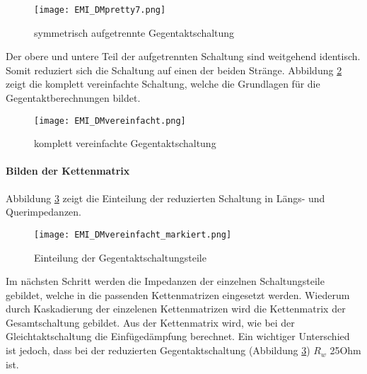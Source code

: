 \begin{figure}[H]
	\centering
	\texttt{[image: EMI\_DMpretty7.png]}
	\caption{symmetrisch aufgetrennte Gegentaktschaltung}
	\label{fig:DMSchaltungSymAufgetrennt}
\end{figure}
Der obere und untere Teil der aufgetrennten Schaltung sind weitgehend identisch. Somit reduziert sich die Schaltung auf einen der beiden Stränge. Abbildung \ref{fig:DMSchaltungvereinfacht} zeigt die komplett vereinfachte Schaltung, welche die Grundlagen für die Gegentaktberechnungen bildet. 
\begin{figure}[H]
	\centering
	\texttt{[image: EMI\_DMvereinfacht.png]}
	\caption{komplett vereinfachte Gegentaktschaltung}
	\label{fig:DMSchaltungvereinfacht}
\end{figure}

\paragraph{Bilden der Kettenmatrix}\label{para:kettenGegentakt}
Abbildung \ref{fig:dmschaltung} zeigt die Einteilung der reduzierten Schaltung in Längs- und Querimpedanzen.
 
\begin{figure}[H]
		\centering
		\texttt{[image: EMI\_DMvereinfacht\_markiert.png]}
		\label{fig:dmschaltung}
		\caption{Einteilung der Gegentaktschaltungsteile}
\end{figure}

Im nächsten Schritt werden die Impedanzen der einzelnen Schaltungsteile gebildet, welche in die passenden Kettenmatrizen eingesetzt werden.
Wiederum durch Kaskadierung der einzelenen Kettenmatrizen wird die Kettenmatrix der Gesamtschaltung gebildet. Aus der Kettenmatrix wird, wie bei der Gleichtaktschaltung die Einfügedämpfung berechnet. Ein wichtiger Unterschied ist jedoch, dass bei der reduzierten Gegentaktschaltung (Abbildung \ref{fig:dmschaltung}) $R_w$ 25Ohm ist. 


